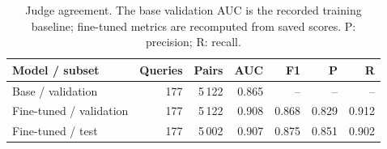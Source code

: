 \begin{table}[t]
\caption{Judge agreement. The base validation AUC is the recorded training baseline; fine-tuned metrics are recomputed from saved scores. P: precision; R: recall.}
\label{tab:judge-results}
\centering\small
\begin{tabularx}{\textwidth}{@{}Lrrrrrr@{}}
\toprule
Model / subset & Queries & Pairs & AUC & F1 & P & R \\
\midrule
Base / validation & 177 & 5\,122 & 0.865 & -- & -- & -- \\
Fine-tuned / validation & 177 & 5\,122 & 0.908 & 0.868 & 0.829 & 0.912 \\
Fine-tuned / test & 177 & 5\,002 & 0.907 & 0.875 & 0.851 & 0.902 \\
\bottomrule
\end{tabularx}
\end{table}
